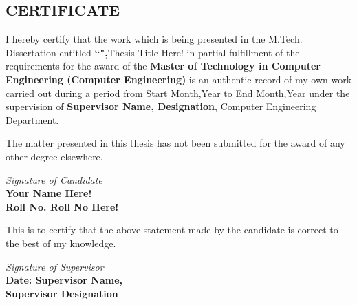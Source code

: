 \documentclass[12pt,a4paper]{report}
\begin{document}
\begin{center}
	\section*{CERTIFICATE}
	\noindent{\rule{\textwidth}{1.5pt}}
\end{center}
I hereby certify that the work which is being presented in the M.Tech. Dissertation entitled  \textbf{``",}Thesis Title Here! in partial fulfillment of the requirements for the award of the \textbf{Master of Technology in Computer Engineering (Computer Engineering)} is an authentic record of my own work carried out during a period from Start Month,Year to End Month,Year under the supervision of \textbf{Supervisor Name, Designation}, Computer Engineering Department.
\vspace{30pt}
\par
The matter presented in this thesis has not been submitted for the award of any other degree elsewhere.
\begin{flushright}
	\textit{Signature of Candidate \\}
	\textbf{Your Name Here!\\ Roll No. Roll No Here!\\}
\end{flushright}
\vspace{30pt}

\par
This is to certify that the above statement made by the candidate is correct to the best of my knowledge.
\vspace{20pt}

\begin{flushright}
	\textit{Signature of Supervisor\\}
	\textbf{Date: \hfill Supervisor Name,\\ Supervisor Designation}
\end{flushright}

\clearpage
\end{document}
